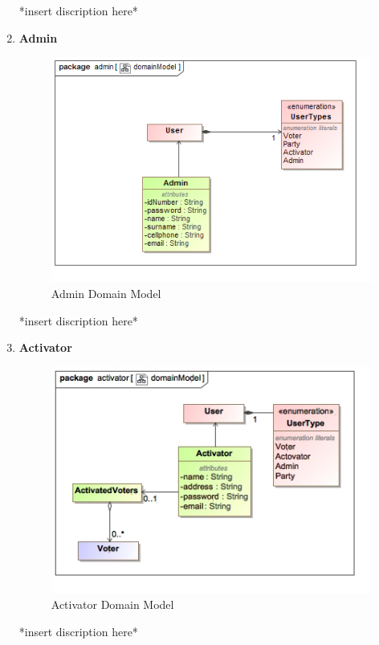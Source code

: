 \begin{enumerate}
			*insert discription here*
			\newline
			\item \textbf{Admin}
			\begin{figure}[H]
				\centering
				\includegraphics[width=0.75\linewidth]{../Images/DomainModels/admin_domainModel.png}
				\caption{Admin Domain Model}
			\end{figure}
			
			*insert discription here*
			\newline
			\item \textbf{Activator}
			\begin{figure}[H]
				\centering
				\includegraphics[width=0.75\linewidth]{../Images/DomainModels/activator_domainModel.png}
				\caption{Activator Domain Model}
			\end{figure}
			
			*insert discription here*
			\newline
\end{enumerate}